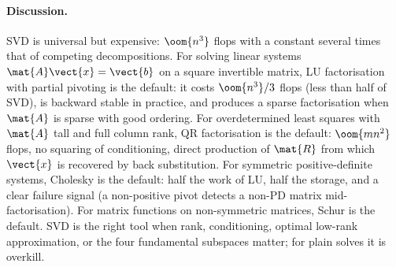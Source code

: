\paragraph{Discussion.}
SVD is universal but expensive: $\oom{n^{3}}$ flops with a constant
several times that of competing decompositions. For solving linear
systems $\mat{A} \vect{x} = \vect{b}$ on a square invertible matrix,
LU factorisation with partial pivoting is the default: it costs
$\oom{n^{3}}/3$ flops (less than half of SVD), is backward stable
in practice, and produces a sparse factorisation when $\mat{A}$ is
sparse with good ordering. For overdetermined least squares with
$\mat{A}$ tall and full column rank, QR factorisation is the
default: $\oom{mn^{2}}$ flops, no squaring of conditioning, direct
production of $\mat{R}$ from which $\vect{x}$ is recovered by back
substitution. For symmetric positive-definite systems, Cholesky is
the default: half the work of LU, half the storage, and a clear
failure signal (a non-positive pivot detects a non-PD matrix
mid-factorisation). For matrix functions on non-symmetric matrices,
Schur is the default. SVD is the right tool when rank, conditioning,
optimal low-rank approximation, or the four fundamental subspaces
matter; for plain solves it is overkill.
